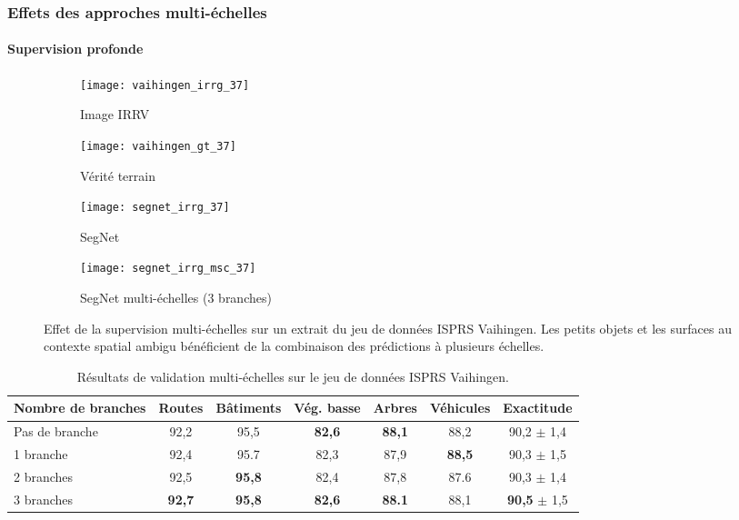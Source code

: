 \subsubsection{Effets des approches multi-échelles}

\paragraph{Supervision profonde}

\begin{figure}[!htb]
	\hfill
	\begin{subfigure}{0.45\textwidth}
    \texttt{[image: vaihingen\_irrg\_37]}
    \caption{Image \gls{IRRV}}
    \end{subfigure}
    \hfill
    \begin{subfigure}{0.45\textwidth}
    \texttt{[image: vaihingen\_gt\_37]}
    \caption{Vérité terrain}
    \end{subfigure}
    \hfill

    \hfill
    \begin{subfigure}{0.45\textwidth}
    \texttt{[image: segnet\_irrg\_37]}
    \caption{SegNet}
    \end{subfigure}
    \hfill
    \begin{subfigure}{0.45\textwidth}
    \texttt{[image: segnet\_irrg\_msc\_37]}
    \caption{SegNet multi-échelles (3 branches)}
    \end{subfigure}
    \hfill
    \caption{Effet de la supervision multi-échelles sur un extrait du jeu de données ISPRS Vaihingen. Les petits objets et les surfaces au contexte spatial ambigu bénéficient de la combinaison des prédictions à plusieurs échelles.\\
		\isprslegende}
    \label{fig:vaihingen_images}
\end{figure}

\begin{table}
    \caption{Résultats de validation multi-échelles sur le jeu de données ISPRS Vaihingen.}
    \label{tab:dsn_vaihingen}
	\begin{tabularx}{\textwidth}{Y c c c c c c}
    \toprule
    Nombre de branches & Routes & Bâtiments & Vég. basse & Arbres & Véhicules & Exactitude\\
    \midrule
    Pas de branche & 92,2 & 95,5 & \textbf{82,6} & \textbf{88,1} & 88,2 & 90,2 {\small $\pm$ 1,4}\\
    1 branche & 92,4 & 95.7 & 82,3 & 87,9 & \textbf{88,5} & 90,3 {\small $\pm$ 1,5}\\
    2 branches & 92,5 & \textbf{95,8} & 82,4 & 87,8 & 87.6 & 90,3 {\small $\pm$ 1,4}\\
    3 branches & \textbf{92,7} & \textbf{95,8} & \textbf{82,6} & \textbf{88.1} & 88,1 & \textbf{90,5} {\small $\pm$ 1,5}\\
    \bottomrule
    \end{tabularx}
\end{table}

